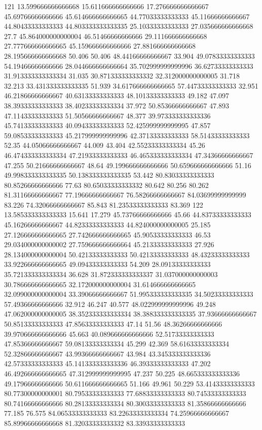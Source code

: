 121 13.599666666666668 15.611666666666666 17.276666666666667 45.69766666666666 45.614666666666665 44.77033333333333 45.11666666666667 44.80433333333333 44.803333333333335 25.10333333333333 27.035666666666668 27.7 45.864000000000004 46.51466666666666 29.111666666666668 27.777666666666665 45.159666666666666 27.881666666666668 28.195666666666668 50.406 50.406 48.44166666666667 33.904 49.07833333333333 54.19466666666666 28.044666666666664 35.702999999999996 36.62733333333333 31.913333333333334 31.035 30.871333333333332 32.312000000000005 31.718 32.213 33.431333333333335 51.939 34.617666666666665 57.44733333333333 32.951 46.21866666666667 40.63133333333333 48.10133333333333 49.182 47.097 38.39333333333333 38.40233333333334 37.972 50.85366666666667 47.893 47.11433333333333 51.50566666666667 48.377 39.973333333333336 45.74133333333333 40.09433333333333 52.425999999999995 47.857 59.08533333333333 45.217999999999996 42.37133333333333 58.51433333333333 52.35 44.05066666666667 44.009 43.404 42.55233333333334 45.26 46.474333333333334 47.21933333333333 46.465333333333334 47.34366666666667 47.255 50.21666666666667 48.64 49.199666666666666 50.659666666666666 51.16 49.998333333333335 50.138333333333335 53.442 80.83033333333333 80.85266666666666 77.63 80.65033333333332 80.642 80.256 80.262 81.31166666666667 77.19666666666667 76.58266666666667 84.03699999999999 83.226 74.32066666666667 85.843 81.23533333333333 83.369
122 13.585333333333333 15.641 17.279 45.73766666666666 45.66 44.83733333333333 45.16266666666667 44.82333333333333 44.824000000000005 25.185 27.126666666666665 27.742666666666665 45.90533333333333 46.53 29.034000000000002 27.759666666666664 45.21333333333333 27.926 28.134000000000004 50.42133333333333 50.42133333333333 48.43233333333333 33.922666666666665 49.09433333333333 54.209 28.09133333333333 35.721333333333334 36.628 31.872333333333337 31.037000000000003 30.786666666666665 32.172000000000004 31.614666666666665 32.099000000000004 33.39066666666667 51.995333333333335 34.50233333333333 57.49366666666666 32.912 46.247 40.577 48.022999999999996 49.248 47.062000000000005 38.352333333333334 38.388333333333335 37.93666666666667 50.85133333333333 47.85633333333333 47.14 51.56 48.36266666666666 39.970666666666666 45.663 40.089666666666666 52.51733333333333 47.85366666666667 59.08133333333334 45.299 42.369 58.61633333333334 52.32866666666667 43.99366666666667 43.984 43.345333333333336 42.57333333333333 45.141333333333336 46.39333333333333 47.202 46.492666666666665 47.312999999999995 47.237 50.225 48.665333333333336 49.17966666666666 50.611666666666665 51.166 49.961 50.229 53.41433333333333 80.77300000000001 80.79533333333333 77.68833333333333 80.74533333333333 80.74166666666666 80.28133333333334 80.30033333333333 81.35866666666666 77.185 76.575 84.06533333333333 83.22633333333334 74.25966666666667 85.89966666666668 81.32033333333332 83.33933333333333
